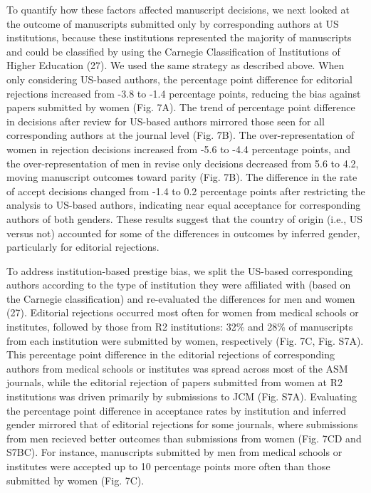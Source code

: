 \documentclass[11pt,]{article}
\begin{document}
To quantify how these factors affected manuscript decisions, we next
looked at the outcome of manuscripts submitted only by corresponding
authors at US institutions, because these institutions represented the
majority of manuscripts and could be classified by using the Carnegie
Classification of Institutions of Higher Education (27). We used the
same strategy as described above. When only considering US-based
authors, the percentage point difference for editorial rejections
increased from -3.8 to -1.4 percentage points, reducing the bias against
papers submitted by women (Fig. 7A). The trend of percentage point
difference in decisions after review for US-based authors mirrored those
seen for all corresponding authors at the journal level (Fig. 7B). The
over-representation of women in rejection decisions increased from -5.6
to -4.4 percentage points, and the over-representation of men in revise
only decisions decreased from 5.6 to 4.2, moving manuscript outcomes
toward parity (Fig. 7B). The difference in the rate of accept decisions
changed from -1.4 to 0.2 percentage points after restricting the
analysis to US-based authors, indicating near equal acceptance for
corresponding authors of both genders. These results suggest that the
country of origin (i.e., US versus not) accounted for some of the
differences in outcomes by inferred gender, particularly for editorial
rejections.

To address institution-based prestige bias, we split the US-based
corresponding authors according to the type of institution they were
affiliated with (based on the Carnegie classification) and re-evaluated
the differences for men and women (27). Editorial rejections occurred
most often for women from medical schools or institutes, followed by
those from R2 institutions: 32\% and 28\% of manuscripts from each
institution were submitted by women, respectively (Fig. 7C, Fig. S7A).
This percentage point difference in the editorial rejections of
corresponding authors from medical schools or institutes was spread
across most of the ASM journals, while the editorial rejection of papers
submitted from women at R2 institutions was driven primarily by
submissions to JCM (Fig. S7A). Evaluating the percentage point
difference in acceptance rates by institution and inferred gender
mirrored that of editorial rejections for some journals, where
submissions from men recieved better outcomes than submissions from
women (Fig. 7CD and S7BC). For instance, manuscripts submitted by men
from medical schools or institutes were accepted up to 10 percentage
points more often than those submitted by women (Fig. 7C).
\end{document}
